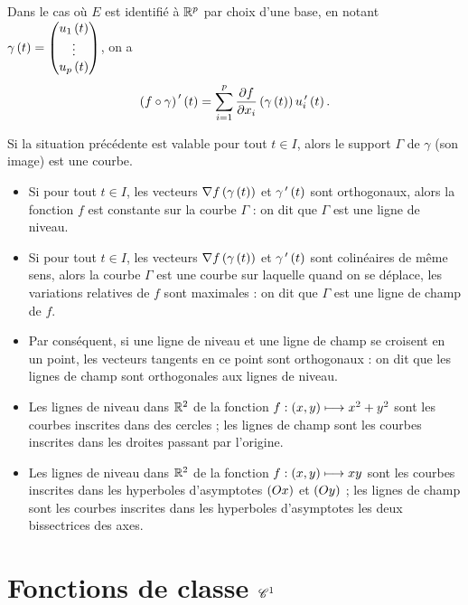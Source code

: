 Dans le cas où \(E\) est identifié à \(\mathbb{R}^p\) par choix d'une base, en notant \(\gamma\left(t\right)=\begin{pmatrix}u_1\left(t\right)\\\vdots\\u_p\left(t\right)\end{pmatrix}\), on a \[\left(f\circ\gamma\right)^{\,\prime}\left(t\right)=\sum_{i=1}^p\pdv{f}{x_i}\left(\gamma\left(t\right)\right)u_i^{\,\prime}\left(t\right).\]

Si la situation précédente est valable pour tout \(t\in I\), alors le support \(\Gamma\) de \(\gamma\) (\ie son image) est une courbe.

\begin{itemize}
    \item Si pour tout \(t\in I\), les vecteurs \(\nabla f\left(\gamma\left(t\right)\right)\) et \(\gamma^{\,\prime}\left(t\right)\) sont orthogonaux, alors la fonction \(f\) est constante sur la courbe \(\Gamma\) : on dit que \(\Gamma\) est une ligne de niveau. \\
    \item Si pour tout \(t\in I\), les vecteurs \(\nabla f\left(\gamma\left(t\right)\right)\) et \(\gamma^{\,\prime}\left(t\right)\) sont colinéaires de même sens, alors la courbe \(\Gamma\) est une courbe sur laquelle quand on se déplace, les variations relatives de \(f\) sont maximales : on dit que \(\Gamma\) est une ligne de champ de \(f\). \\
    \item Par conséquent, si une ligne de niveau et une ligne de champ se croisent en un point, les vecteurs tangents en ce point sont orthogonaux : on dit que les lignes de champ sont orthogonales aux lignes de niveau.
\end{itemize}

\begin{ex}
\begin{itemize}
    \item Les lignes de niveau dans \(\mathbb{R}^2\) de la fonction \(f:\left(x,y\right)\longmapsto x^2+y^2\) sont les courbes inscrites dans des cercles ; les lignes de champ sont les courbes inscrites dans les droites passant par l'origine. \\
    \item Les lignes de niveau dans \(\mathbb{R}^2\) de la fonction \(f:\left(x,y\right)\longmapsto xy\) sont les courbes inscrites dans les hyperboles d'asymptotes \(\left(Ox\right)\) et \(\left(Oy\right)\) ; les lignes de champ sont les courbes inscrites dans les hyperboles d'asymptotes les deux bissectrices des axes.
\end{itemize}
\end{ex}

\section{Fonctions de classe \(\mathscr{C}^{1}\)}

